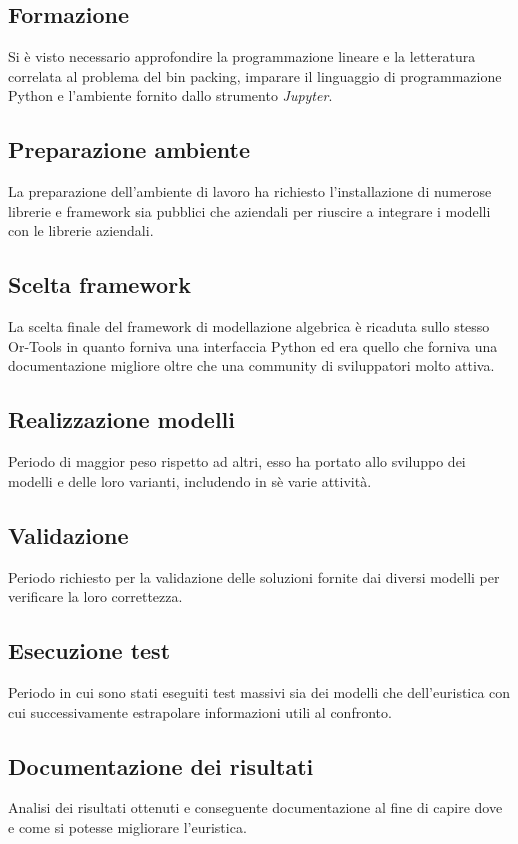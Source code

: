 \subsection{Formazione}
Si è visto necessario approfondire la programmazione lineare e la letteratura correlata al problema del bin packing, imparare il linguaggio di programmazione Python e l'ambiente fornito dallo strumento \textit{Jupyter}.
\subsection{Preparazione ambiente}
La preparazione dell'ambiente di lavoro ha richiesto l'installazione di numerose librerie e framework sia pubblici che aziendali per riuscire a integrare i modelli con le librerie aziendali.
\subsection{Scelta framework}
La scelta finale del framework di modellazione algebrica è ricaduta sullo stesso Or-Tools in quanto forniva una interfaccia Python ed era 				quello che forniva una documentazione migliore oltre che una community di sviluppatori molto attiva.
\subsection{Realizzazione modelli}
Periodo di maggior peso rispetto ad altri, esso ha portato allo sviluppo dei modelli e delle loro varianti, includendo in sè varie attività.
\subsection{Validazione}
Periodo richiesto per la validazione delle soluzioni fornite dai diversi modelli per verificare la loro correttezza.
\subsection{Esecuzione test}
Periodo in cui sono stati eseguiti test massivi sia dei modelli che dell'euristica con cui successivamente estrapolare informazioni utili al confronto.
\subsection{Documentazione dei risultati}
Analisi dei risultati ottenuti e conseguente documentazione al fine di capire dove e come si potesse migliorare l'euristica.
